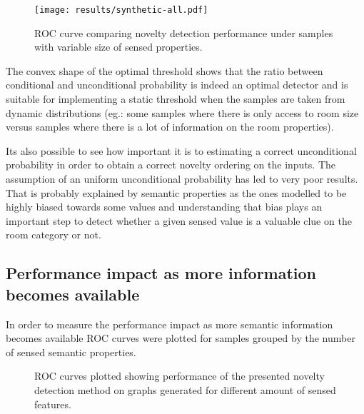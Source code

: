 \documentclass[runningheads,a4paper]{llncs}
\begin{document}
\begin{figure}[h]
\centering
\texttt{[image: results/synthetic-all.pdf]}

\caption{\label{fig:synthetic-roc}ROC curve comparing novelty detection performance
         under samples with variable size of sensed properties.}
\end{figure}

The convex shape of the optimal threshold shows that the ratio between conditional
and unconditional probability is indeed an optimal detector and is suitable for
implementing a static threshold when the samples are taken from dynamic
distributions (eg.: some samples where there is only access to room size versus
samples where there is a lot of information on the room properties).

Its also possible to see how important it is to estimating a correct unconditional
probability in order to obtain a correct novelty ordering on the inputs.
The assumption of an uniform unconditional probability has led to very poor results.
That is probably explained by semantic properties as the ones modelled to be highly
biased towards some values and understanding that bias plays an important step
to detect whether a given sensed value is a valuable clue on the room category
or not.



\subsection{Performance impact as more information becomes available}
In order to measure the performance impact as more semantic information becomes
available ROC curves were plotted for samples grouped by the number of sensed
semantic properties.

\begin{figure}[h]
\centering

\qquad
{}

\qquad
{}

\caption{\label{fig:synthetic-roc-breakdown}ROC curves plotted showing performance of the
         presented novelty detection method on graphs generated for different amount of
         sensed features.}
\end{figure}
\end{document}
